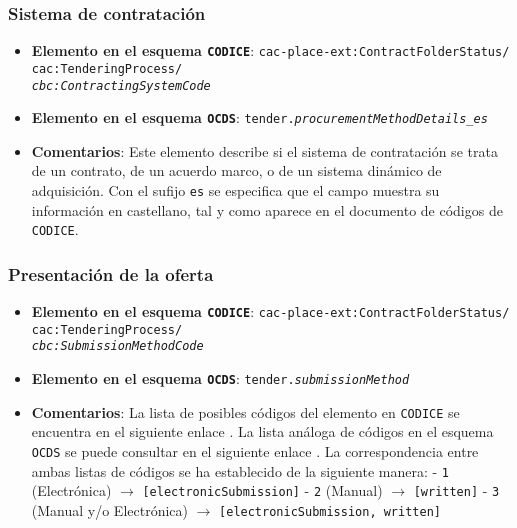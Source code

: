         \subsubsection{Sistema de contratación} \label{subsubsec:SistemaDeContratacion}
            \begin{itemize}
                \item \textbf{Elemento en el esquema \texttt{CODICE}}:
                    \tabto{7.6cm} \texttt{cac-place-ext:ContractFolderStatus/} \\
                    \tabto{7.6cm} \texttt{cac:TenderingProcess/} \\
                    \tabto{7.6cm} \texttt{\textit{cbc:ContractingSystemCode}}
                \item \textbf{Elemento en el esquema \texttt{OCDS}}:
                    \tabto{7.6cm} \texttt{tender.\textit{procurementMethodDetails\_es}}
                \item \textbf{Comentarios}: Este elemento describe si el sistema de contratación se trata de un contrato, de un acuerdo marco, o de un sistema dinámico de adquisición. Con el sufijo \texttt{es} se especifica que el campo muestra su información en castellano, tal y como aparece en el documento de códigos \cite{CR10} de \texttt{CODICE}.
            \end{itemize}
        
        \subsubsection{Presentación de la oferta} \label{subsec:PresentacionOferta}
            \begin{itemize}
                \item \textbf{Elemento en el esquema \texttt{CODICE}}:
                    \tabto{7.6cm} \texttt{cac-place-ext:ContractFolderStatus/} \\
                    \tabto{7.6cm} \texttt{cac:TenderingProcess/} \\
                    \tabto{7.6cm} \texttt{\textit{cbc:SubmissionMethodCode}}
                \item \textbf{Elemento en el esquema \texttt{OCDS}}:
                    \tabto{7.6cm} \texttt{tender.\textit{submissionMethod}}
                \item \textbf{Comentarios}: La lista de posibles códigos del elemento en \texttt{CODICE} se encuentra en el siguiente enlace \cite{CR11}.
                    La lista análoga de códigos en el esquema \texttt{OCDS} se puede consultar en el siguiente enlace \cite{CR12}.
                    La correspondencia entre ambas listas de códigos se ha establecido de la siguiente manera:
                        \subitem - \texttt{1} (Electrónica) $\rightarrow$ \texttt{[electronicSubmission]}
                        \subitem - \texttt{2} (Manual) $\rightarrow$ \texttt{[written]}
                        \subitem - \texttt{3} (Manual y/o Electrónica) $\rightarrow$ \texttt{[electronicSubmission, written]}
            \end{itemize}
        
